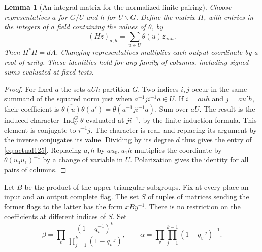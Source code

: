 \documentclass[a4paper,11pt]{article}
\newtheorem{lemma}[proposition]{Lemma}
\theoremstyle{definition}
\theoremstyle{remark}
\numberwithin{equation}{section}
\begin{document}
\begin{lemma}[An integral matrix for the normalized finite pairing]
\leavevmode\label{lem:whittakermatrix526}
Choose representatives \(a\) for \(G/U\) and \(h\) for \(U\backslash G\).
Define the matrix \(H\), with entries in the integers of a field
containing the values of \(\theta\), by
\[
          (Hz)_{a,h}=\sum_{u\in U}\theta(u) z_{auh}.
\]
Then \(H^*H=dA\). Changing representatives multiplies each output
coordinate by a root of unity. These identities hold for any family
of columns, including signed sums evaluated at fixed tests.
\end{lemma}
\begin{proof}
For fixed \(a\) the sets \(aUh\) partition \(G\). Two indices
\(i,j\) occur in the same summand of the squared norm just when
\(a^{-1}ji^{-1}a\in U\). If \(i=auh\) and \(j=au'h\), their
coefficient is \(\overline{\theta(u)}\theta(u')
=\theta(a^{-1}ji^{-1}a)\). Sum over \(aU\). The result is the
induced character \(\operatorname{Ind}_U^G\theta\) evaluated at
\(ji^{-1}\), by the finite induction formula. This element is
conjugate to \(i^{-1}j\). The character is real, and replacing its
argument by the inverse conjugates its value. Dividing by its
degree \(d\) thus gives the entry of \eqref{eq:actual125}.
Replacing \(a,h\) by \(a u_0,u_1 h\) multiplies the coordinate by
\(\theta(u_0u_1)^{-1}\) by a change of variable in \(U\).
Polarization gives the identity for all pairs of columns.
\end{proof}

Let \(B\) be the product of the upper triangular subgroups.
Fix at every place an input and an output complete flag. The set
\(S\) of tuples of matrices sending the former flags to the latter
has the form \(xBy^{-1}\). There is no restriction on the
coefficients at different indices of \(S\).
Set
\[
 \beta=\prod_v\frac{(1-q_v^{-1})^k}{\prod_{j=1}^k(1-q_v^{-j})},
 \qquad
 \alpha=\prod_v\prod_{j=1}^{k-1}(1-q_v^{-j})^{-1}.
\]
\end{document}
